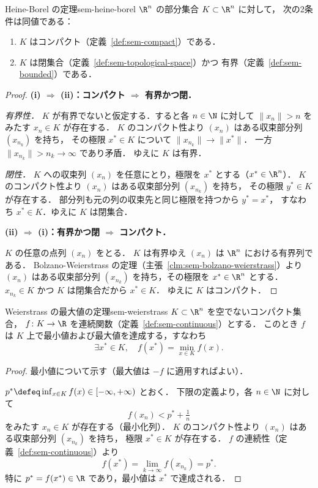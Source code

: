 \begin{theorem}{Heine-Borel の定理}{sem-heine-borel}
  $\R^n$ の部分集合 $K \subset \R^n$ に対して，
  次の2条件は同値である：
  \begin{enumerate}
    \item[(i)] $K$ はコンパクト（定義~\ref{def:sem-compact}）である．
    \item[(ii)] $K$ は閉集合（定義~\ref{def:sem-topological-space}）かつ
      有界（定義~\ref{def:sem-bounded}）である．
  \end{enumerate}
\end{theorem}

\begin{proof}
  \textbf{(i) $\Rightarrow$ (ii)：コンパクト $\Rightarrow$ 有界かつ閉．}

  \textit{有界性．}
  $K$ が有界でないと仮定する．すると各 $n \in \N$ に対して
  $\|x_n\| > n$ をみたす $x_n \in K$ が存在する．
  $K$ のコンパクト性より $(x_n)$ はある収束部分列 $(x_{n_k})$ を持ち，
  その極限 $x^* \in K$ について $\|x_{n_k}\| \to \|x^*\|$．
  一方 $\|x_{n_k}\| > n_k \to \infty$ であり矛盾．
  ゆえに $K$ は有界．

  \textit{閉性．}
  $K$ への収束列 $(x_n)$ を任意にとり，極限を $x^*$ とする（$x^* \in \R^n$）．
  $K$ のコンパクト性より $(x_n)$ はある収束部分列 $(x_{n_k})$ を持ち，
  その極限 $y^* \in K$ が存在する．
  部分列も元の列の収束先と同じ極限を持つから $y^* = x^*$，
  すなわち $x^* \in K$．ゆえに $K$ は閉集合．

  \textbf{(ii) $\Rightarrow$ (i)：有界かつ閉 $\Rightarrow$ コンパクト．}

  $K$ の任意の点列 $(x_n)$ をとる．
  $K$ は有界ゆえ $(x_n)$ は $\R^n$ における有界列である．
  Bolzano-Weierstrass の定理（主張~\ref{clm:sem-bolzano-weierstrass}）より
  $(x_n)$ はある収束部分列 $(x_{n_k})$ を持ち，その極限を $x^* \in \R^n$ とする．
  $x_{n_k} \in K$ かつ $K$ は閉集合だから $x^* \in K$．
  ゆえに $K$ はコンパクト．
\end{proof}

\begin{theorem}{Weierstrass の最大値の定理}{sem-weierstrass}
  $K \subset \R^n$ を空でないコンパクト集合，
  $f \colon K \to \R$ を連続関数（定義~\ref{def:sem-continuous}）とする．
  このとき $f$ は $K$ 上で最小値および最大値を達成する，すなわち
  \[
    \exists x^* \in K,\quad f(x^*) = \min_{x \in K} f(x).
  \]
\end{theorem}

\begin{proof}
  最小値について示す（最大値は $-f$ に適用すればよい）．

  $p^* \defeq \inf_{x \in K} f(x) \in [-\infty, +\infty)$ とおく．
  下限の定義より，各 $n \in \N$ に対して
  \[
    f(x_n) < p^* + \tfrac{1}{n}
  \]
  をみたす $x_n \in K$ が存在する（最小化列）．
  $K$ のコンパクト性より $(x_n)$ はある収束部分列 $(x_{n_k})$ を持ち，
  極限 $x^* \in K$ が存在する．
  $f$ の連続性（定義~\ref{def:sem-continuous}）より
  \[
    f(x^*) = \lim_{k \to \infty} f(x_{n_k}) = p^*.
  \]
  特に $p^* = f(x^*) \in \R$ であり，最小値は $x^*$ で達成される．
\end{proof}

